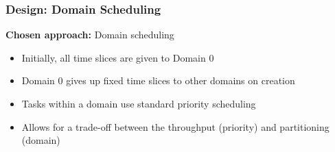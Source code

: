 \begin{frame}
\frametitle{Design: Domain Scheduling}
\textbf{Chosen approach:} Domain scheduling
\vspace{0.1cm}
\begin{center}
\centering
\resizebox{0.5\textwidth}{!}{}
\end{center}

\vspace{0.2cm}
\begin{itemize}
  \item Initially, all time slices are given to Domain 0
  \item Domain 0 gives up fixed time slices to other domains on creation
  \item Tasks within a domain use standard priority scheduling
  \item Allows for a trade-off between the throughput (priority) and
    partitioning (domain)
\end{itemize}

\end{frame}

